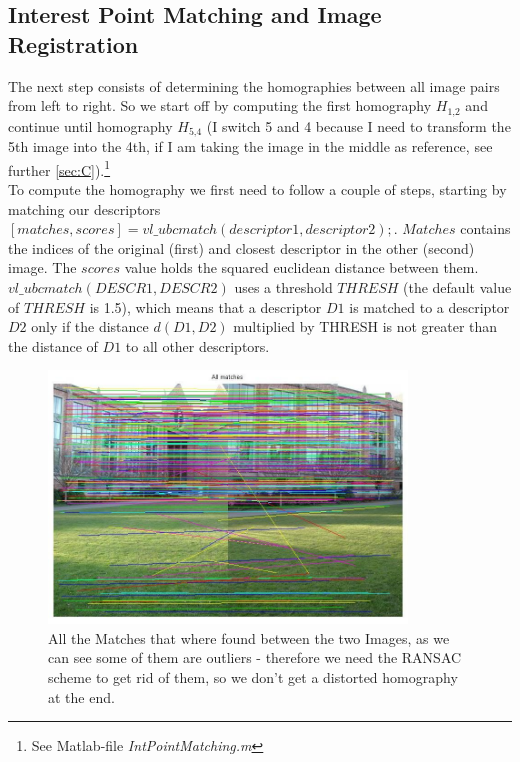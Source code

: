 \documentclass[subfigure,epsfig,fleqn,float,numbers=noenddot]{scrartcl}
\begin{document}
\subsection{Interest Point Matching and Image Registration}
\label{sec:B}
The next step consists of determining the homographies between all image pairs from left to right. So we start off by computing the first homography $H_\text{1,2}$ and continue until homography $H_\text{5,4}$ (I switch 5 and 4 because I need to transform the 5th image into the 4th, if I am taking the image in the middle as reference, see further \ref{sec:C}).\footnote{See Matlab-file \emph{IntPointMatching.m} } \\
To compute the homography we first need to follow a couple of steps, starting by matching our descriptors $[matches, scores] = vl\_ubcmatch(descriptor1, descriptor2);$. $Matches$ contains the indices of the original (first) and closest descriptor in the other (second) image. The $scores$ value holds the squared euclidean distance between them.  $vl\_ubcmatch(DESCR1, DESCR2)$ uses a threshold $THRESH$ (the default value of $THRESH$ is 1.5), which means that a descriptor $D1$ is matched to a descriptor $D2$ only if the distance $d(D1,D2)$ multiplied by THRESH is not greater than the distance of $D1$ to all other descriptors.\\
	\begin{figure}[H]
		\centering
		\includegraphics[width=0.85\textwidth]{./img/allMatches.jpg}
		\caption{All the Matches that where found between the two Images, as we can see some of them are outliers - therefore we need the RANSAC scheme to get rid of them, so we don't get a distorted homography at the end.}
		\label{img:outliers}
	\end{figure}
\end{document}
